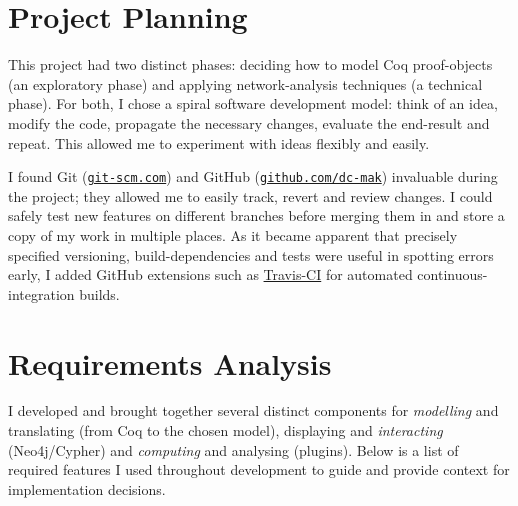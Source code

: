 \section{Project Planning}

This project had two distinct phases: deciding how to model Coq proof-objects
(an exploratory phase) and applying network-analysis techniques (a technical
phase). For both, I chose a spiral software development model: think of an idea,
modify the code, propagate the necessary changes, evaluate the end-result and
repeat. This allowed me to experiment with ideas flexibly and easily.

I found Git (\href{http://git-scm.com}{\texttt{git-scm.com}}) and GitHub
(\href{http://github.com/dc-mak}{\texttt{github.com/dc-mak}}) invaluable during
the project; they allowed me to easily track, revert and review changes. I could
safely test new features on different branches before merging them in and store
a copy of my work in multiple places. As it became apparent that precisely
specified versioning, build-dependencies and tests were useful in spotting
errors early, I added GitHub extensions such as
\href{https://travis-ci.org}{Travis-CI} for automated continuous-integration
builds.

\section{Requirements Analysis}

I developed and brought together several distinct components for
\emph{modelling} and translating (from Coq to the chosen model), displaying and
\emph{interacting} (Neo4j/Cypher) and \emph{computing} and analysing (plugins).
Below is a list of required features I used throughout development to guide and
provide context for implementation decisions.

